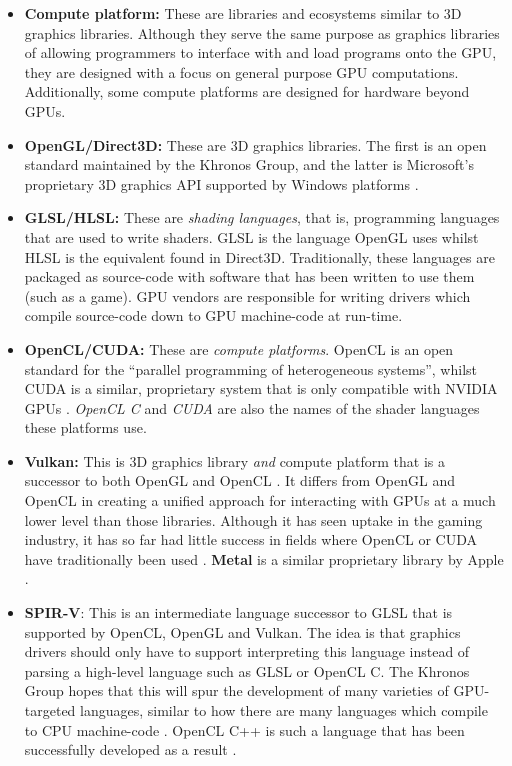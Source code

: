 \documentclass[a4paper,12pt,twoside,openright]{report}
\begin{document}
\begin{itemize}
    \item \textbf{Compute platform:} These are libraries and ecosystems similar
    to 3D graphics libraries. Although they serve the same purpose as graphics
    libraries of allowing programmers to interface with and load programs onto
    the GPU, they are designed with a focus on general purpose GPU
    computations. Additionally, some compute platforms are designed for
    hardware beyond GPUs.

    \item \textbf{OpenGL/Direct3D:} These are 3D graphics libraries. The first
    is an open standard maintained by the Khronos Group, and the
    latter is Microsoft's proprietary 3D graphics API supported by Windows
    platforms \cite{OpenGL} \cite{Direct3D}.

    \item \textbf{GLSL/HLSL:} These are \textit{shading languages}, that is,
    programming languages that are used to write shaders. GLSL is the language
    OpenGL uses whilst HLSL is the equivalent found in Direct3D. Traditionally,
    these languages are packaged as source-code with software that has been
    written to use them (such as a game). GPU vendors are responsible for
    writing drivers which compile source-code down to GPU machine-code at
    run-time.

    \item \textbf{OpenCL/CUDA:} These are \textit{compute platforms}. OpenCL is
    an open standard for the ``parallel programming of heterogeneous systems'',
    whilst CUDA is a similar, proprietary system that is only compatible with
    NVIDIA GPUs \cite{OpenCL} \cite{CUDA}. \textit{OpenCL C} and \textit{CUDA}
    are also the names of the shader languages these platforms use.

    \item \textbf{Vulkan:} This is 3D graphics library \textit{and} compute
    platform that is a successor to both OpenGL and OpenCL \cite{Vulkan}. It
    differs from OpenGL and OpenCL in creating a unified approach for
    interacting with GPUs at a much lower level than those libraries. Although
    it has seen uptake in the gaming industry, it has so far had little success
    in fields where OpenCL or CUDA have traditionally been used \cite{TODO}
    \cite{TODO}. \textbf{Metal} is a similar proprietary library by Apple
    \cite{Metal}.

    \item \textbf{SPIR-V}: This is an intermediate language successor to GLSL
    that is supported by OpenCL, OpenGL and Vulkan. The idea is that graphics
    drivers should only have to support interpreting this language instead of
    parsing a high-level language such as GLSL or OpenCL C. The Khronos Group
    hopes that this will spur the development of many varieties of GPU-targeted
    languages, similar to how there are many languages which compile to CPU
    machine-code \cite{SPIRV}. OpenCL C++ is such a language that has been
    successfully developed as a result \cite{OpenCLCPPWhitePaper}.


\end{itemize}
\end{document}
